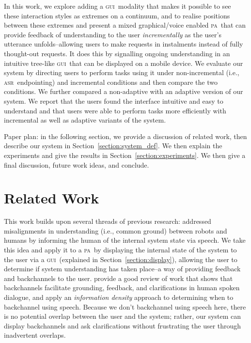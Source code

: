 \documentclass[11pt]{article}
\newcommand{\asr}[0]{\textsc{asr}}
\newcommand{\ui}[0]{\textsc{gui}}
\newcommand{\pa}[0]{\textsc{pa}}
\begin{document}
In this work, we explore adding a \ui\ modality that makes it possible to see these interaction styles as extremes on a continuum, and to realise positions between these extremes and present a mixed graphical/voice enabled \pa\ that can provide feedback of understanding to the user \emph{incrementally} as the user's utterance unfolds--allowing users to make requests in instalments instead of fully thought-out requests. It does this by signalling ongoing understanding in an intuitive tree-like \ui\ that can be displayed on a mobile device. We evaluate our system by directing users to perform tasks using it under non-incremental (i.e., \asr\ endpointing) and incremental conditions and then compare the two conditions. We further compared a non-adaptive with an adaptive version of our system. We report that the users found the interface intuitive and easy to understand and that users were able to perform tasks more efficiently with incremental as well as adaptive variants of the system.

Paper plan: in the following section, we provide a discussion of related work, then describe our system in Section~\ref{section:system_def}. We then explain the experiments and give the results in Section~\ref{section:experiments}. We then give a final discussion, future work ideas, and conclude. 

\section{Related Work}
\label{section:related_work}

This work builds upon several threads of previous research:  addressed misalignments in understanding (i.e., common ground) \cite{clarkschaefer:contrdis} between robots and humans by informing the human of the internal system state via speech. We take this idea and apply it to a \pa\ by displaying the internal state of the system to the user via a \ui\ (explained in Section~\ref{section:display}), allowing the user to determine if system understanding has taken place--a way of providing feedback and backchannels to the user.  provide a good review of work that shows that backchannels facilitate grounding, feedback, and clarifications in human spoken dialogue, and apply an \emph{information density} approach to determining when to backchannel using speech. Because we don't backchannel using speech here, there is no potential overlap between the user and the system; rather, our system can display backchannels and ask clarifications without frustrating the user through inadvertent overlaps.
\end{document}
